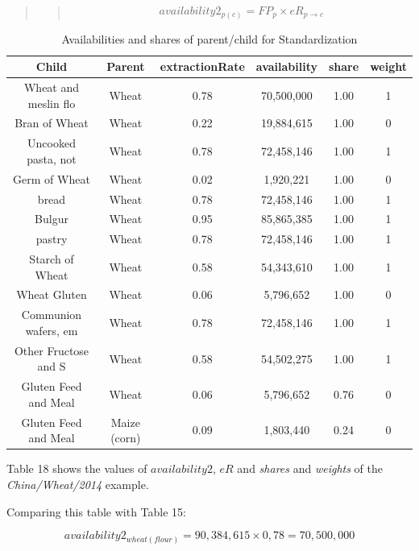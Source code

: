 \documentclass[]{article}
\begin{document}
\begin{quote}
\begin{quote}
\begin{equation}
\label{eq:availability2}
availability2_{p(c)} = FP_{p}\times eR_{p\to c}
\end{equation}
\end{quote}
\end{quote}

\begin{table}

\caption{\label{tab:t17}Availabilities and shares of parent/child for Standardization}
\centering
\begin{tabular}[t]{c|c|c|c|c|c}
\hline
Child & Parent & extractionRate & availability & share & weight\\
\hline
Wheat and meslin flo & Wheat & 0.78 & 70,500,000 & 1.00 & 1\\
\hline
Bran of Wheat & Wheat & 0.22 & 19,884,615 & 1.00 & 0\\
\hline
Uncooked pasta, not & Wheat & 0.78 & 72,458,146 & 1.00 & 1\\
\hline
Germ of Wheat & Wheat & 0.02 & 1,920,221 & 1.00 & 0\\
\hline
bread & Wheat & 0.78 & 72,458,146 & 1.00 & 1\\
\hline
Bulgur & Wheat & 0.95 & 85,865,385 & 1.00 & 1\\
\hline
pastry & Wheat & 0.78 & 72,458,146 & 1.00 & 1\\
\hline
Starch of Wheat & Wheat & 0.58 & 54,343,610 & 1.00 & 1\\
\hline
Wheat Gluten & Wheat & 0.06 & 5,796,652 & 1.00 & 0\\
\hline
Communion wafers, em & Wheat & 0.78 & 72,458,146 & 1.00 & 1\\
\hline
Other Fructose and S & Wheat & 0.58 & 54,502,275 & 1.00 & 1\\
\hline
Gluten Feed and Meal & Wheat & 0.06 & 5,796,652 & 0.76 & 0\\
\hline
Gluten Feed and Meal & Maize (corn) & 0.09 & 1,803,440 & 0.24 & 0\\
\hline
\end{tabular}
\end{table}

Table 18 shows the values of \(availability2\), \(eR\) and \emph{shares}
and \emph{weights} of the \emph{China/Wheat/2014} example.

Comparing this table with Table 15:

\begin{equation}
\label{eq:avExample1}
availability2_{wheat(flour)} = 90,384,615\times 0,78 = 70,500,000
\end{equation}
\end{document}

